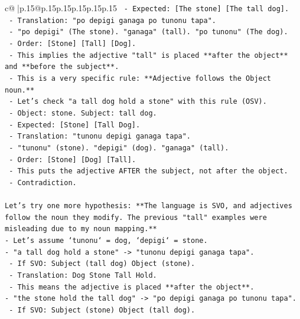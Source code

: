\documentclass{article}
\begin{document}
{\begin{supertabular}{c@{$\;$}|p{.15\linewidth}@{}p{.15\linewidth}p{.15\linewidth}p{.15\linewidth}p{.15\linewidth}p{.15\linewidth}}
{{{\texttt{       {-} Expected: {[}The stone{]} {[}The tall dog{]}.} \\
\texttt{       {-} Translation: "po depigi ganaga po tunonu tapa".} \\
\texttt{       {-} "po depigi" (The stone). "ganaga" (tall). "po tunonu" (The dog).} \\
\texttt{       {-} Order: {[}Stone{]} {[}Tall{]} {[}Dog{]}.} \\
\texttt{       {-} This implies the adjective "tall" is placed **after the object** and **before the subject**.} \\
\texttt{       {-} This is a very specific rule: **Adjective follows the Object noun.**} \\
\texttt{       {-} Let's check "a tall dog hold a stone" with this rule (OSV).} \\
\texttt{         {-} Object: stone. Subject: tall dog.} \\
\texttt{         {-} Expected: {[}Stone{]} {[}Tall Dog{]}.} \\
\texttt{         {-} Translation: "tunonu depigi ganaga tapa".} \\
\texttt{         {-} "tunonu" (stone). "depigi" (dog). "ganaga" (tall).} \\
\texttt{         {-} Order: {[}Stone{]} {[}Dog{]} {[}Tall{]}.} \\
\texttt{         {-} This puts the adjective AFTER the subject, not after the object.} \\
\texttt{         {-} Contradiction.} \\
\\ 
\texttt{Let's try one more hypothesis: **The language is SVO, and adjectives follow the noun they modify. The previous "tall" examples were misleading due to my noun mapping.**} \\
\texttt{{-} Let's assume `tunonu` = dog, `depigi` = stone.} \\
\texttt{{-} "a tall dog hold a stone" {-}> "tunonu depigi ganaga tapa".} \\
\texttt{  {-} If SVO: Subject (tall dog) Object (stone).} \\
\texttt{  {-} Translation: Dog Stone Tall Hold.} \\
\texttt{  {-} This means the adjective is placed **after the object**.} \\
\texttt{{-} "the stone hold the tall dog" {-}> "po depigi ganaga po tunonu tapa".} \\
\texttt{  {-} If SVO: Subject (stone) Object (tall dog).} \\
}}}
\end{supertabular}}
\end{document}
